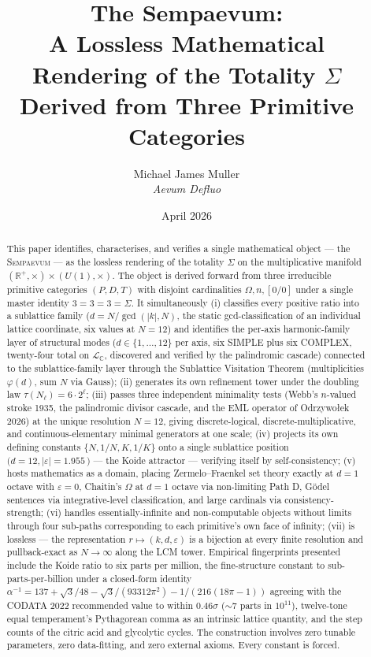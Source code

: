 \documentclass[11pt,a4paper]{article}
\title{\bfseries The Sempaevum:\\[2pt]
A Lossless Mathematical Rendering of the Totality $\Sigma$\\[2pt]
Derived from Three Primitive Categories}
\author{Michael James Muller\\
\small\textit{Aevum Defluo}}
\date{April 2026}
\theoremstyle{definition}
\theoremstyle{remark}
\newcommand{\R}{\mathbb{R}}
\newcommand{\C}{\mathbb{C}}
\newcommand{\Sempaevum}{\textsc{Sempaevum}}
\begin{document}
\maketitle

\begin{abstract}
\noindent
This paper identifies, characterises, and verifies a single mathematical object — the \Sempaevum{} — as the lossless rendering of the totality $\Sigma$ on the multiplicative manifold $(\R^{+},\times) \times (U(1),\times)$. The object is derived forward from three irreducible primitive categories $(P,D,T)$ with disjoint cardinalities $\Omega, n, [0/0]$ under a single master identity $3=3=3=\Sigma$. It simultaneously (i) classifies every positive ratio into a sublattice family ($d = N/\gcd(|k|,N)$, the static gcd-classification of an individual lattice coordinate, six values at $N=12$) and identifies the per-axis harmonic-family layer of structural modes ($d \in \{1,\ldots,12\}$ per axis, six SIMPLE plus six COMPLEX, twenty-four total on $\mathcal{L}_{\C}$, discovered and verified by the palindromic cascade) connected to the sublattice-family layer through the Sublattice Visitation Theorem (multiplicities $\varphi(d)$, sum $N$ via Gauss); (ii) generates its own refinement tower under the doubling law $\tau(N_{\ell}) = 6 \cdot 2^{\ell}$; (iii) passes three independent minimality tests (Webb's $n$-valued stroke 1935, the palindromic divisor cascade, and the EML operator of Odrzywołek 2026) at the unique resolution $N=12$, giving discrete-logical, discrete-multiplicative, and continuous-elementary minimal generators at one scale; (iv) projects its own defining constants $\{N, 1/N, K, 1/K\}$ onto a single sublattice position $(d=12, |\varepsilon|=1.955$\,\textcent$)$ — the Koide attractor — verifying itself by self-consistency; (v) hosts mathematics as a domain, placing Zermelo--Fraenkel set theory exactly at $d=1$ octave with $\varepsilon=0$, Chaitin's $\Omega$ at $d=1$ octave via non-limiting Path D, Gödel sentences via integrative-level classification, and large cardinals via consistency-strength; (vi) handles essentially-infinite and non-computable objects without limits through four sub-paths corresponding to each primitive's own face of infinity; (vii) is lossless — the representation $r \mapsto (k,d,\varepsilon)$ is a bijection at every finite resolution and pullback-exact as $N \to \infty$ along the LCM tower. Empirical fingerprints presented include the Koide ratio to six parts per million, the fine-structure constant to sub-parts-per-billion under a closed-form identity $\alpha^{-1} = 137 + \sqrt{3}/48 - \sqrt{3}/(93312\pi^{2}) - 1/(216(18\pi-1))$ agreeing with the CODATA 2022 recommended value to within $0.46\sigma$ ($\sim 7$ parts in $10^{11}$), twelve-tone equal temperament's Pythagorean comma as an intrinsic lattice quantity, and the step counts of the citric acid and glycolytic cycles. The construction involves zero tunable parameters, zero data-fitting, and zero external axioms. Every constant is forced.
\end{abstract}
\end{document}
